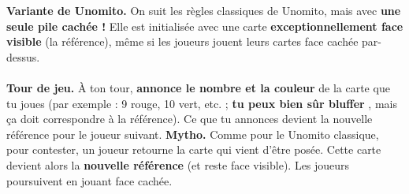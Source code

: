 \documentclass[a4paper]{memoir}
\begin{document}
{\footnotesize

\noindent
\textbf{ Variante de Unomito.} On suit les règles classiques de Unomito, mais avec \textbf{une seule pile cachée !} 
Elle est initialisée avec une carte \textbf{exceptionnellement face visible} (la référence), même si les joueurs jouent leurs cartes face cachée par-dessus.
\\
\\
\noindent
\textbf{ Tour de jeu.} À ton tour, \textbf{annonce le nombre et la couleur} de la carte que tu joues (par exemple : 9 rouge, 10 vert, etc. ; \textbf{tu peux bien sûr bluffer} , mais ça doit correspondre à la référence).
Ce que tu annonces devient la nouvelle référence pour le joueur suivant.
\newpage
\noindent
\textbf{ Mytho.} Comme pour le Unomito classique, pour contester, un joueur retourne la carte qui vient d’être posée.
Cette carte devient alors la \textbf{nouvelle référence} (et reste face visible). Les joueurs poursuivent en jouant face cachée.
}
\end{document}
